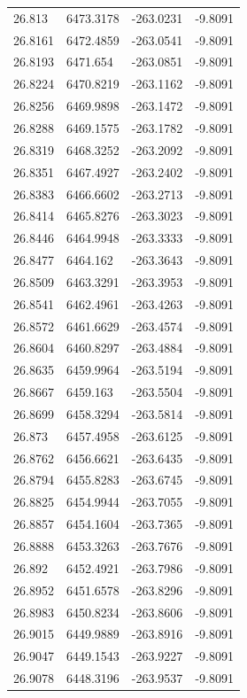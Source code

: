 \begin{table}[H]
\begin{tabular}{llll}
26.813 & 6473.3178 & -263.0231 & -9.8091 \\
26.8161 & 6472.4859 & -263.0541 & -9.8091 \\
26.8193 & 6471.654 & -263.0851 & -9.8091 \\
26.8224 & 6470.8219 & -263.1162 & -9.8091 \\
26.8256 & 6469.9898 & -263.1472 & -9.8091 \\
26.8288 & 6469.1575 & -263.1782 & -9.8091 \\
26.8319 & 6468.3252 & -263.2092 & -9.8091 \\
26.8351 & 6467.4927 & -263.2402 & -9.8091 \\
26.8383 & 6466.6602 & -263.2713 & -9.8091 \\
26.8414 & 6465.8276 & -263.3023 & -9.8091 \\
26.8446 & 6464.9948 & -263.3333 & -9.8091 \\
26.8477 & 6464.162 & -263.3643 & -9.8091 \\
26.8509 & 6463.3291 & -263.3953 & -9.8091 \\
26.8541 & 6462.4961 & -263.4263 & -9.8091 \\
26.8572 & 6461.6629 & -263.4574 & -9.8091 \\
26.8604 & 6460.8297 & -263.4884 & -9.8091 \\
26.8635 & 6459.9964 & -263.5194 & -9.8091 \\
26.8667 & 6459.163 & -263.5504 & -9.8091 \\
26.8699 & 6458.3294 & -263.5814 & -9.8091 \\
26.873 & 6457.4958 & -263.6125 & -9.8091 \\
26.8762 & 6456.6621 & -263.6435 & -9.8091 \\
26.8794 & 6455.8283 & -263.6745 & -9.8091 \\
26.8825 & 6454.9944 & -263.7055 & -9.8091 \\
26.8857 & 6454.1604 & -263.7365 & -9.8091 \\
26.8888 & 6453.3263 & -263.7676 & -9.8091 \\
26.892 & 6452.4921 & -263.7986 & -9.8091 \\
26.8952 & 6451.6578 & -263.8296 & -9.8091 \\
26.8983 & 6450.8234 & -263.8606 & -9.8091 \\
26.9015 & 6449.9889 & -263.8916 & -9.8091 \\
26.9047 & 6449.1543 & -263.9227 & -9.8091 \\
26.9078 & 6448.3196 & -263.9537 & -9.8091 \\

\end{tabular}
\end{table}
